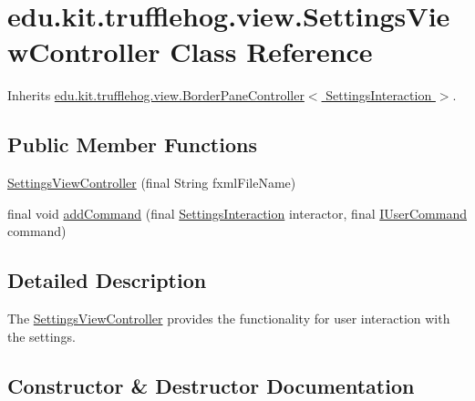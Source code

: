 \hypertarget{classedu_1_1kit_1_1trufflehog_1_1view_1_1_settings_view_controller}{}\section{edu.\+kit.\+trufflehog.\+view.\+Settings\+View\+Controller Class Reference}
\label{classedu_1_1kit_1_1trufflehog_1_1view_1_1_settings_view_controller}


Inherits \hyperlink{classedu_1_1kit_1_1trufflehog_1_1view_1_1_border_pane_controller}{edu.\+kit.\+trufflehog.\+view.\+Border\+Pane\+Controller$<$ Settings\+Interaction $>$}.

\subsection*{Public Member Functions}
\begin{DoxyCompactItemize}
\item 
\hyperlink{classedu_1_1kit_1_1trufflehog_1_1view_1_1_settings_view_controller_a5b5c8ca102b9e2fe9dab65eb2d949ce7}{Settings\+View\+Controller} (final String fxml\+File\+Name)
\item 
final void \hyperlink{classedu_1_1kit_1_1trufflehog_1_1view_1_1_settings_view_controller_a75ea223684ccbe09b32f4bd37e95e54a}{add\+Command} (final \hyperlink{enumedu_1_1kit_1_1trufflehog_1_1interaction_1_1_settings_interaction}{Settings\+Interaction} interactor, final \hyperlink{interfaceedu_1_1kit_1_1trufflehog_1_1command_1_1usercommand_1_1_i_user_command}{I\+User\+Command} command)
\end{DoxyCompactItemize}


\subsection{Detailed Description}
The \hyperlink{classedu_1_1kit_1_1trufflehog_1_1view_1_1_settings_view_controller}{Settings\+View\+Controller} provides the functionality for user interaction with the settings. 

\subsection{Constructor \& Destructor Documentation}
\hypertarget{classedu_1_1kit_1_1trufflehog_1_1view_1_1_settings_view_controller_a5b5c8ca102b9e2fe9dab65eb2d949ce7}{}
